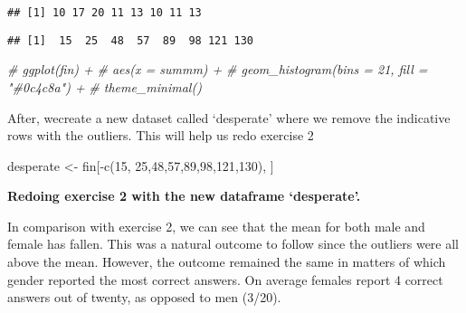 \documentclass[
]{article}
\newenvironment{Shaded}{\begin{snugshade}}{\end{snugshade}}
\newcommand{\CommentTok}[1]{\textcolor[rgb]{0.56,0.35,0.01}{\textit{#1}}}
\newcommand{\DecValTok}[1]{\textcolor[rgb]{0.00,0.00,0.81}{#1}}
\newcommand{\FunctionTok}[1]{\textcolor[rgb]{0.00,0.00,0.00}{#1}}
\newcommand{\NormalTok}[1]{#1}
\newcommand{\OtherTok}[1]{\textcolor[rgb]{0.56,0.35,0.01}{#1}}
\newcommand{\SpecialCharTok}[1]{\textcolor[rgb]{0.00,0.00,0.00}{#1}}
\begin{document}
\begin{enumerate}
\begin{verbatim}
## [1] 10 17 20 11 13 10 11 13
\end{verbatim}

\begin{Shaded}
\end{Shaded}

\begin{verbatim}
## [1]  15  25  48  57  89  98 121 130
\end{verbatim}

\begin{Shaded}
\begin{Highlighting}[]
\CommentTok{\# ggplot(fin) +}
\CommentTok{\#   aes(x = summm) +}
\CommentTok{\#   geom\_histogram(bins = 21, fill = "\#0c4c8a") +}
\CommentTok{\#   theme\_minimal()}
\end{Highlighting}
\end{Shaded}

  After, wecreate a new dataset called `desperate' where we remove the
  indicative rows with the outliers. This will help us redo exercise 2

\begin{Shaded}
\begin{Highlighting}[]
\NormalTok{desperate }\OtherTok{\textless{}{-}}\NormalTok{ fin[}\SpecialCharTok{{-}}\FunctionTok{c}\NormalTok{(}\DecValTok{15}\NormalTok{, }\DecValTok{25}\NormalTok{,}\DecValTok{48}\NormalTok{,}\DecValTok{57}\NormalTok{,}\DecValTok{89}\NormalTok{,}\DecValTok{98}\NormalTok{,}\DecValTok{121}\NormalTok{,}\DecValTok{130}\NormalTok{), ]}
\end{Highlighting}
\end{Shaded}

  \textbf{Redoing exercise 2 with the new dataframe `desperate'.}

  In comparison with exercise 2, we can see that the mean for both male
  and female has fallen. This was a natural outcome to follow since the
  outliers were all above the mean. However, the outcome remained the
  same in matters of which gender reported the most correct answers. On
  average females report 4 correct answers out of twenty, as opposed to
  men (3/20).


\end{enumerate}
\end{document}
